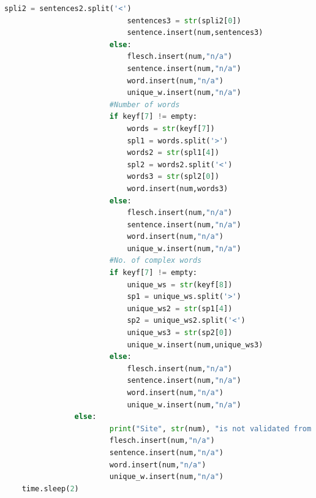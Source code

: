 \documentclass{article}
\begin{document}
\begin{lstlisting}[language=Python]
                            spli2 = sentences2.split('<')
                            sentences3 = str(spli2[0])
                            sentence.insert(num,sentences3)
                        else:
                            flesch.insert(num,"n/a")
                            sentence.insert(num,"n/a")
                            word.insert(num,"n/a")
                            unique_w.insert(num,"n/a")  
                        #Number of words
                        if keyf[7] != empty:
                            words = str(keyf[7])
                            spl1 = words.split('>')
                            words2 = str(spl1[4])
                            spl2 = words2.split('<')
                            words3 = str(spl2[0])
                            word.insert(num,words3)
                        else:
                            flesch.insert(num,"n/a")
                            sentence.insert(num,"n/a")
                            word.insert(num,"n/a")
                            unique_w.insert(num,"n/a")  
                        #No. of complex words
                        if keyf[7] != empty:
                            unique_ws = str(keyf[8])
                            sp1 = unique_ws.split('>')
                            unique_ws2 = str(sp1[4])
                            sp2 = unique_ws2.split('<')
                            unique_ws3 = str(sp2[0])
                            unique_w.insert(num,unique_ws3)
                        else:
                            flesch.insert(num,"n/a")
                            sentence.insert(num,"n/a")
                            word.insert(num,"n/a")
                            unique_w.insert(num,"n/a")  
                else:
                        print("Site", str(num), "is not validated from check 2")
                        flesch.insert(num,"n/a")
                        sentence.insert(num,"n/a")
                        word.insert(num,"n/a")
                        unique_w.insert(num,"n/a")            
    time.sleep(2)
\end{lstlisting}
\end{document}
